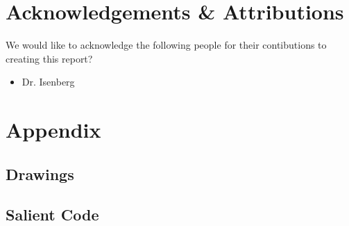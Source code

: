 \documentclass[12pt]{report}
\renewcommand\thesection{\arabic{section}}
\begin{document}

% 
% 

\newpage
\section*{Acknowledgements \& Attributions}
We would like to acknowledge the following people for their contibutions to creating this report?
\begin{itemize}
  \item Dr. Isenberg
\end{itemize}

\newpage
\appendix
\renewcommand\thesection{\Roman{section}}
\renewcommand\thesubsection{\roman{subsection}}
\section{Appendix}\label{sec:app}
\subsection{Drawings}
\subsection{Salient Code}
% 
\end{document}
